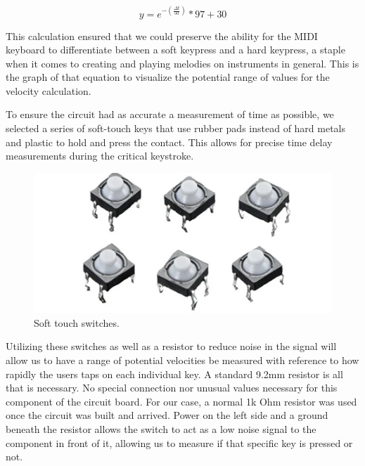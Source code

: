 \begin{equation*}
  y = e^{-(\frac{\Delta t}{50})} * 97 + 30
\end{equation*}

This calculation ensured that we could preserve the ability for the MIDI keyboard to
differentiate between a soft keypress and a hard keypress, a staple when it comes to
creating and playing melodies on instruments in general. This is the graph of that
equation to visualize the potential range of values for the velocity calculation.


To ensure the circuit had as accurate a measurement of time as possible, we selected a
series of soft-touch keys that use rubber pads instead of hard metals and plastic to hold
and press the contact. This allows for precise time delay measurements during the critical
keystroke.

\begin{figure}[h!]
  \centering
  \includegraphics[width=\linewidth]{image/softtouchswitches.png}
  \caption{Soft touch switches.}
\end{figure}


Utilizing these switches as well as a resistor to reduce noise in the signal will allow us
to have a range of potential velocities be measured with reference to how rapidly the
users taps on each individual key. A standard 9.2mm resistor is all that is necessary. No
special connection nor unusual values necessary for this component of the circuit board.
For our case, a normal 1k Ohm resistor was used once the circuit was built and arrived.
Power on the left side and a ground beneath the resistor allows the switch to act as a low
noise signal to the component in front of it, allowing us to measure if that specific key
is pressed or not.

